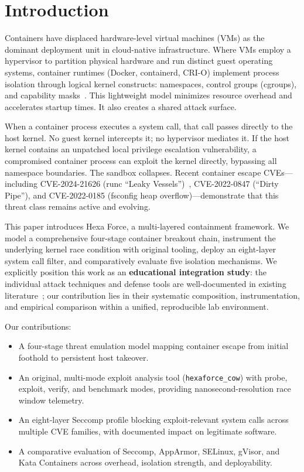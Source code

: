 \documentclass[conference]{IEEEtran}
\begin{document}
\section{Introduction}
Containers have displaced hardware-level virtual machines (VMs) as the dominant deployment unit in cloud-native infrastructure. Where VMs employ a hypervisor to partition physical hardware and run distinct guest operating systems, container runtimes (Docker, containerd, CRI-O) implement process isolation through logical kernel constructs: namespaces, control groups (cgroups), and capability masks~\cite{b7,b9}. This lightweight model minimizes resource overhead and accelerates startup times. It also creates a shared attack surface.

When a container process executes a system call, that call passes directly to the host kernel. No guest kernel intercepts it; no hypervisor mediates it. If the host kernel contains an unpatched local privilege escalation vulnerability, a compromised container process can exploit the kernel directly, bypassing all namespace boundaries. The sandbox collapses. Recent container escape CVEs---including CVE-2024-21626 (runc ``Leaky Vessels'')~\cite{b15}, CVE-2022-0847 (``Dirty Pipe''), and CVE-2022-0185 (fsconfig heap overflow)---demonstrate that this threat class remains active and evolving.

This paper introduces Hexa Force, a multi-layered containment framework. We model a comprehensive four-stage container breakout chain, instrument the underlying kernel race condition with original tooling, deploy an eight-layer system call filter, and comparatively evaluate five isolation mechanisms. We explicitly position this work as an \textbf{educational integration study}: the individual attack techniques and defense tools are well-documented in existing literature~\cite{b1,b3,b4,b5}; our contribution lies in their systematic composition, instrumentation, and empirical comparison within a unified, reproducible lab environment.

Our contributions:
\begin{itemize}
    \item A four-stage threat emulation model mapping container escape from initial foothold to persistent host takeover.
    \item An original, multi-mode exploit analysis tool (\texttt{hexaforce\_cow}) with probe, exploit, verify, and benchmark modes, providing nanosecond-resolution race window telemetry.
    \item An eight-layer Seccomp profile blocking exploit-relevant system calls across multiple CVE families, with documented impact on legitimate software.
    \item A comparative evaluation of Seccomp, AppArmor, SELinux, gVisor, and Kata Containers across overhead, isolation strength, and deployability.
\end{itemize}
\end{document}
